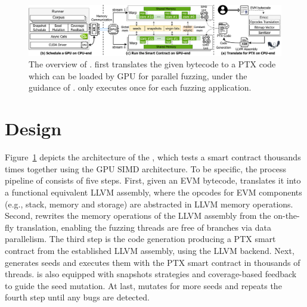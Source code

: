 \begin{figure}[!ht]
\centerline{\includegraphics[width=\textwidth]{images/GFL-overview.drawio.pdf}}
\caption{The overview of {\tool}. {\translator} first translates the given bytecode to a PTX code which can be loaded by GPU for parallel fuzzing, under the guidance of {\runner}. {\translator} only executes once for each fuzzing application.}
\vspace{-0.1in}
\label{fig:overview}
\end{figure}

\section{Design}
\label{sec:design}

Figure~\ref{fig:overview} depicts the architecture of the {\tool}, which tests a smart contract thousands times together using the GPU SIMD architecture.
%
To be specific, the process pipeline of {\tool} consists of five steps. 
%
First, given an EVM bytecode, {\translator} translates it into a functional equivalent LLVM assembly, where the opcodes for EVM components (e.g., stack, memory and storage) are abstracted in LLVM memory operations.
%
Second, {\translator} rewrites the memory operations of the LLVM assembly from the on-the-fly translation, enabling the fuzzing threads are free of branches via data parallelism.
%
The third step is the code generation producing a PTX smart contract from the established LLVM assembly, using the LLVM backend\cite{llvm2021bin}.
Next, {\runner} generates seeds and executes them with the PTX smart contract in thousands of threads. 
{\runner} is also equipped with snapshots strategies and coverage-based feedback to guide the seed mutation.
At last, {\runner} mutates for more seeds and repeats the fourth step until any bugs are detected. 

